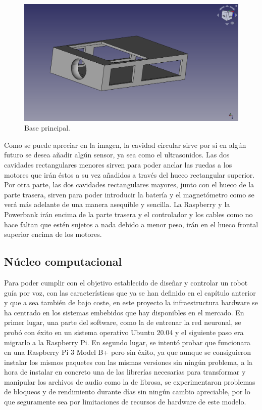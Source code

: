 \begin{figure}[H]
  \centering
  \includegraphics[scale=0.25]{figs/base} %
  \caption{Base principal.}
  \label{fig:Base_principal}
\end{figure}

Como se puede apreciar en la imagen, la cavidad circular sirve por si en algún futuro se desea añadir algún sensor, ya sea como el ultrasonidos. Las dos cavidades rectangulares menores sirven para poder anclar las ruedas a los motores que irán éstos a su vez añadidos a través del hueco rectangular superior. Por otra parte, las dos cavidades rectangulares mayores, junto con el hueco de la parte trasera, sirven para poder introducir la batería y el magnetómetro como se verá más adelante de una manera asequible y sencilla. La Raspberry y la Powerbank irán encima de la parte trasera y el controlador y los cables como no hace faltan que estén sujetos a nada debido a menor peso, irán en el hueco frontal superior encima de los motores.


\subsection{Núcleo computacional}
\label{subsec:plataforma_hardware}


Para poder cumplir con el objetivo establecido de diseñar y controlar un robot guía por voz, con las características que ya se han definido en el capítulo anterior y que a sea también de bajo coste, en este proyecto la infraestructura hardware se ha centrado en los sistemas embebidos que hay disponibles en el mercado. En primer lugar, una parte del software, como la de entrenar la red neuronal, se probó con éxito en un sistema operativo Ubuntu 20.04 y el siguiente paso era migrarlo a la Raspberry Pi. En segundo lugar, se intentó probar que funcionara en una Raspberry Pi 3 Model B+ pero sin éxito, ya que aunque se consiguieron instalar los mismos paquetes con las mismas versiones sin ningún problema, a la hora de instalar en concreto una de las librerías necesarias para transformar y manipular los archivos de audio como la de librosa, se experimentaron problemas de bloqueos y de rendimiento durante días sin ningún cambio apreciable, por lo que seguramente sea por limitaciones de recursos de hardware de este modelo.\\

